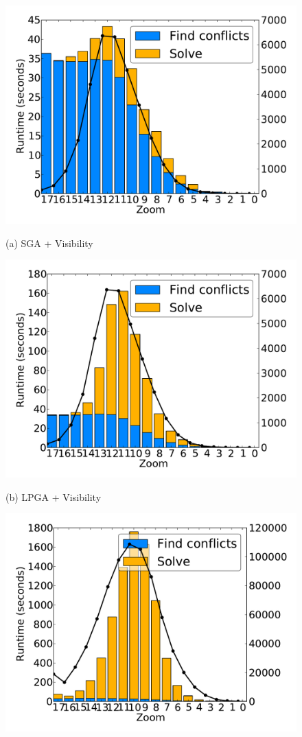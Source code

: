 \documentclass[11pt, oneside]{report}
\begin{document}
{\begin{figure}[tb]
  \begin{minipage}{0.329\linewidth}
    \centerline{\includegraphics[width=0.9\linewidth]{./figs-cvl/prelim_pnt_500k_tourism_heuristic_A.pdf}}
    \centerline{(a) SGA + Visibility}
  \end{minipage} \hfill
  \begin{minipage}{0.329\linewidth}
    \centerline{\includegraphics[width=0.9\linewidth]{./figs-cvl/prelim_pnt_500k_tourism_lp_A.pdf}}
    \centerline{(b) LPGA + Visibility}
  \end{minipage} \hfill
  \begin{minipage}{0.329\linewidth}
    \centerline{\includegraphics[width=0.9\linewidth]{./figs-cvl/prelim_pnt_500k_tourism_lp_B.pdf}}

\end{minipage}
\end{figure}}
\end{document}
